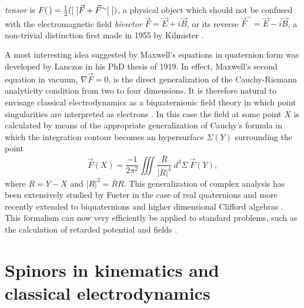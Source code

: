 \documentclass [12pt,a4paper      ]{article}
\newcommand{\CON}{\overline}          %
\newcommand{\Q}{[\hspace{1.mm}]} %
\newcommand{\A}{(\hspace{.5mm})} %
\newcommand{\REV}{\sim}               %
\begin{document}
\emph{tensor} is $F\A = \tfrac{1}{2} (\Q \vec{F} + \vec{F}^\REV\Q)$, a physical object which should not be confused with the electromagnetic field \emph{bivector} $\vec{F} = \vec{E}+i\vec{B}$, or its reverse  $\vec{F}^\REV = \vec{E}-i\vec{B}$, a non-trivial distinction first made in 1955 by Kilmister \cite{R17}.%

     A  most interesting idea suggested by Maxwell's equations in 
quaternion  form was developed by Lanczos \cite{R18} in his PhD  thesis 
of 1919.   In effect,  Maxwell's second equation in vacuum,  $\nabla \vec{F} = 0$, is  
the  direct  generalization  of  the  Cauchy-Riemann  analyticity 
condition from two to four dimensions.  It is therefore natural to 
envisage  classical  electrodynamics as  a  biquaternionic  field 
theory  in which point singularities are interpreted as electrons 
\cite{R19}.   In  this case the field at some point $X$ is calculated  by 
means  of  the appropriate generalization  of  Cauchy's  formula 
in which  the  integration contour becomes an  hypersurface
 $\Sigma(Y)$ surrounding the point
%
\begin{equation}\label{E34}
 \vec{F}(X)  = \frac{-1}{2\pi^2} \iiint \frac{\CON{R}}{|R|^4}
                                  ~ d^3{\Sigma} ~ \vec{F}(Y),   %
\end{equation}
%
where $R=Y-X$ and $|R|^2 = \CON{R}R$. This generalization of complex analysis 
has  been  extensively  studied  by Fueter in the  case  of  real 
quaternions \cite{R20} and more recently extended to biquaternions  and 
higher  dimensional Clifford algebras \cite{R21}.   This formalism  can 
now very efficiently be applied to standard problems, such as the 
calculation of retarded potential and fields \cite{R22}.


\section{Spinors in kinematics and\\ classical electrodynamics}
\label{spi:0}
\end{document}
